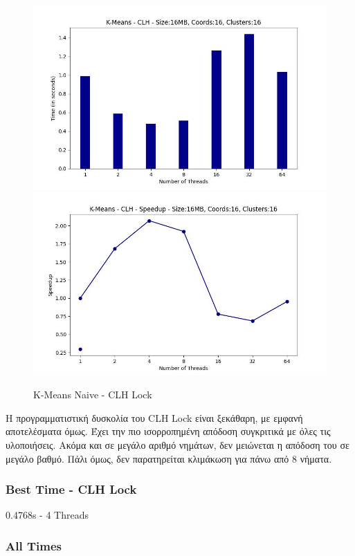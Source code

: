 \documentclass[letterpaper,12pt]{article}
\begin{document}
\begin{figure}[H]
    \centering
        \includegraphics[scale=0.4]{outFilesCores/plots/kmeans_locks_clh.jpg}
        \includegraphics[scale=0.4]{outFilesCores/plots/kmeans_locks_clh_speedup.jpg}
    \caption{K-Means Naive - CLH Lock}
    \label{fig:K-Means Naive - CLH Lock}
\end{figure}

Η προγραμματιστική δυσκολία του CLH Lock είναι ξεκάθαρη, με εμφανή αποτελέσματα όμως. Έχει την πιο
ισορροπημένη απόδοση συγκριτικά με όλες τις υλοποιήσεις. Ακόμα και σε μεγάλο αριθμό νημάτων, δεν μειώνεται η 
απόδοση του σε μεγάλο βαθμό. Πάλι όμως, δεν παρατηρείται κλιμάκωση για πάνω από 8 νήματα. 

\subsubsection*{Best Time - CLH Lock}
0.4768s - 4 Threads

\subsubsection*{All Times}
\end{document}
